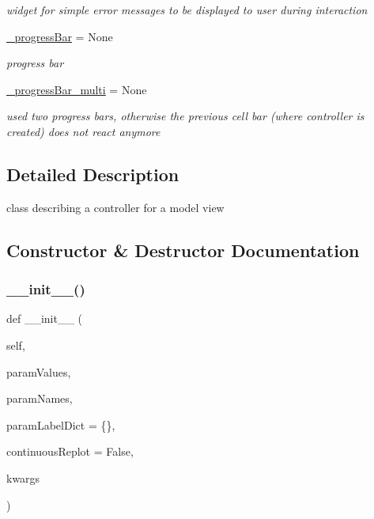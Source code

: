 \begin{DoxyCompactItemize}
\begin{DoxyCompactList}\small\item\em widget for simple error messages to be displayed to user during interaction \end{DoxyCompactList}\item 
\hyperlink{class_mu_mo_t_1_1_mu_mo_tcontroller_a018864aa22d2adb0d3958fb0adbce8e2}{\+\_\+progress\+Bar} = None
\begin{DoxyCompactList}\small\item\em progress bar \end{DoxyCompactList}\item 
\hyperlink{class_mu_mo_t_1_1_mu_mo_tcontroller_a1da52cde6b2b94a1005eaa6898d2f8c5}{\+\_\+progress\+Bar\+\_\+multi} = None
\begin{DoxyCompactList}\small\item\em used two progress bars, otherwise the previous cell bar (where controller is created) does not react anymore \end{DoxyCompactList}\end{DoxyCompactItemize}


\subsection{Detailed Description}
class describing a controller for a model view 

\subsection{Constructor \& Destructor Documentation}
\mbox{\label{class_mu_mo_t_1_1_mu_mo_tcontroller_a320992330c3f5d744e197ee09a828ac7}} 
\subsubsection{\texorpdfstring{\+\_\+\+\_\+init\+\_\+\+\_\+()}{\_\_init\_\_()}}
{\footnotesize\ttfamily def \+\_\+\+\_\+init\+\_\+\+\_\+ (\begin{DoxyParamCaption}\item[{}]{self,  }\item[{}]{param\+Values,  }\item[{}]{param\+Names,  }\item[{}]{param\+Label\+Dict = {\ttfamily \{\}},  }\item[{}]{continuous\+Replot = {\ttfamily False},  }\item[{}]{kwargs }\end{DoxyParamCaption})}



